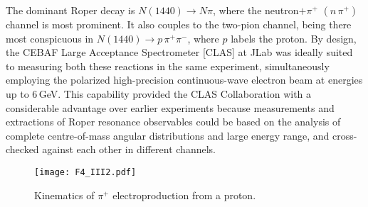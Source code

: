 The dominant Roper decay is $N(1440) \to N\pi$, where the neutron$+\pi^+$ $(n\,\pi^+)$ channel is most prominent.  It also couples to the two-pion channel, being there most conspicuous in $N(1440) \to p\,\pi^+\pi^-$, where $p$ labels the proton.  By design, the CEBAF Large Acceptance Spectrometer [CLAS] at JLab was ideally suited to measuring both these reactions in the same experiment, simultaneously employing the polarized high-precision continuous-wave electron beam at energies up to 6\,GeV.  This capability provided the CLAS Collaboration with a considerable advantage over earlier experiments because measurements and extractions of Roper resonance observables could be based on the analysis of complete centre-of-mass angular distributions and large energy range, and cross-checked against each other in different channels.

\begin{figure}[t]
\centerline{\texttt{[image: F4\_III2.pdf]}}
\caption{\label{kinematics}
Kinematics of $\pi^+$ electroproduction from a proton.}
\end{figure}

